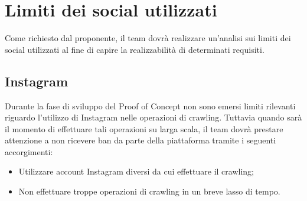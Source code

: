 \section{Limiti dei social utilizzati}
Come richiesto dal proponente, il team dovrà realizzare un'analisi sui limiti dei social utilizzati al fine di capire la realizzabilità di determinati requisiti.

\subsection{Instagram}
Durante la fase di sviluppo del Proof of Concept non sono emersi limiti rilevanti riguardo l'utilizzo di Instagram nelle operazioni di crawling. Tuttavia quando sarà il momento di effettuare tali operazioni su larga scala, il team dovrà prestare attenzione a non ricevere ban da parte della piattaforma tramite i seguenti accorgimenti:
\begin{itemize}
    \item Utilizzare account Instagram diversi da cui effettuare il crawling;
    \item Non effettuare troppe operazioni di crawling in un breve lasso di tempo.
\end{itemize}


